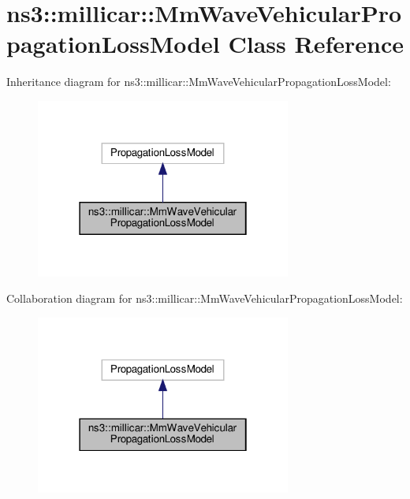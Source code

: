 \hypertarget{classns3_1_1millicar_1_1MmWaveVehicularPropagationLossModel}{}\section{ns3\+:\+:millicar\+:\+:Mm\+Wave\+Vehicular\+Propagation\+Loss\+Model Class Reference}
\label{classns3_1_1millicar_1_1MmWaveVehicularPropagationLossModel}


Inheritance diagram for ns3\+:\+:millicar\+:\+:Mm\+Wave\+Vehicular\+Propagation\+Loss\+Model\+:\nopagebreak
\begin{figure}[H]
\begin{center}
\leavevmode
\includegraphics[width=238pt]{classns3_1_1millicar_1_1MmWaveVehicularPropagationLossModel__inherit__graph}
\end{center}
\end{figure}


Collaboration diagram for ns3\+:\+:millicar\+:\+:Mm\+Wave\+Vehicular\+Propagation\+Loss\+Model\+:\nopagebreak
\begin{figure}[H]
\begin{center}
\leavevmode
\includegraphics[width=238pt]{classns3_1_1millicar_1_1MmWaveVehicularPropagationLossModel__coll__graph}
\end{center}
\end{figure}
